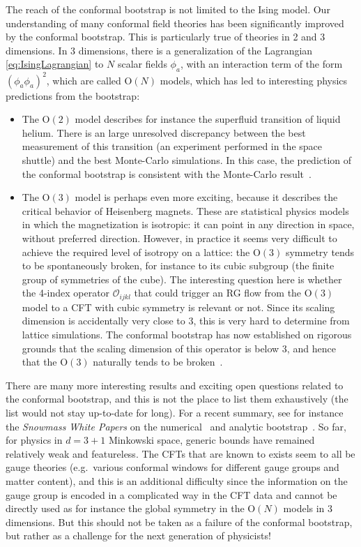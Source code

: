 \documentclass[a4paper,12pt]{article}
\numberwithin{equation}{section}
\begin{document}
The reach of the conformal bootstrap is not limited to the Ising model.
Our understanding of many conformal field theories has been significantly improved by the conformal bootstrap. This is particularly true of theories in 2 and 3 dimensions. In 3 dimensions, there is a generalization of the Lagrangian \eqref{eq:IsingLagrangian} to $N$ scalar fields $\phi_a$, with an interaction term of the form $(\phi_a \phi_a)^2$, which are called $\text{O}(N)$ models, which has led to interesting physics predictions from the bootstrap:
\begin{itemize}

\item
The $\text{O}(2)$ model describes for instance the superfluid transition of liquid helium. There is an large unresolved discrepancy between the best measurement of this transition (an experiment performed in the space shuttle) and the best Monte-Carlo simulations. In this case, the prediction of the conformal bootstrap is consistent with the Monte-Carlo result~\cite{Chester:2019ifh}. 

\item
The $\text{O}(3)$ model is perhaps even more exciting, because it describes the critical behavior of Heisenberg magnets. These are statistical physics models in which the magnetization is isotropic: it can point in any direction in space, without preferred direction. However, in practice it seems very difficult to achieve the required level of isotropy on a lattice: the $\text{O}(3)$ symmetry tends to be spontaneously broken, for instance to its cubic subgroup (the finite group of symmetries of the cube).
The interesting question here is whether the 4-index operator $\mathcal{O}_{ijkl}$ that could trigger an RG flow from the $\text{O}(3)$ model to a CFT with cubic symmetry is relevant or not. Since its scaling dimension is accidentally very close to 3, this is very hard to determine from lattice simulations. 
The conformal bootstrap has now established on rigorous grounds that the scaling dimension of this operator is below 3, and hence that the $\text{O}(3)$ naturally tends to be broken~\cite{Chester:2020iyt}.

\end{itemize}
%
There are many more interesting results and exciting open questions related to the conformal bootstrap, and this is not the place to list them exhaustively (the list would not stay up-to-date for long). For a recent summary, see for instance the \emph{Snowmass White Papers} on the numerical~\cite{Poland:2022qrs} and analytic bootstrap~\cite{Hartman:2022zik}.
So far, for physics in $d = 3 + 1$ Minkowski space, generic bounds have remained relatively weak and featureless. The CFTs that are known to exists seem to all be gauge theories (e.g.~various conformal windows for different gauge groups and matter content), and this is an additional difficulty since the information on the gauge group is encoded in a complicated way in the CFT data and cannot be directly used as for instance the global symmetry in the $\text{O}(N)$ models in 3 dimensions.
But this should not be taken as a failure of the conformal bootstrap, but rather as a challenge for the next generation of physicists!
\end{document}
